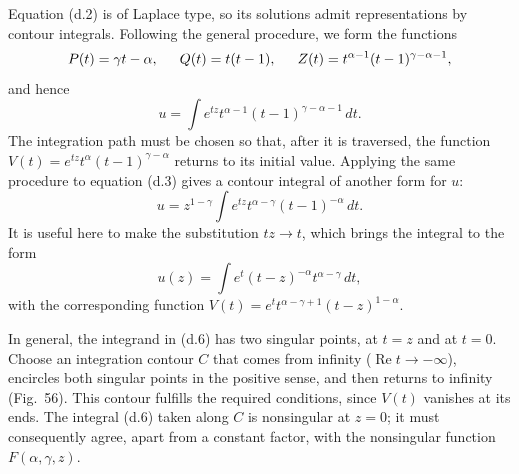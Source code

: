 Equation (d.2) is of Laplace type, so its solutions admit representations by
contour integrals. Following the general procedure, we form the functions
\[
 P(t)=\gamma t-\alpha,\hspace{1.5em}Q(t)=t(t-1),\hspace{1.5em}
 Z(t)=t^{\alpha-1}(t-1)^{\gamma-\alpha-1},
\]
and hence
\begin{equation}
 u=\int e^{tz}t^{\alpha-1}(t-1)^{\gamma-\alpha-1}\,dt.
 \tag{d.5}
\end{equation}
The integration path must be chosen so that, after it is traversed, the
function $V(t)=e^{tz}t^\alpha(t-1)^{\gamma-\alpha}$ returns to its initial
value. Applying the same procedure to equation (d.3) gives a contour integral
of another form for $u$:
\[
 u=z^{1-\gamma}\int e^{tz}t^{\alpha-\gamma}(t-1)^{-\alpha}\,dt.
\]
It is useful here to make the substitution $tz\to t$, which brings the
integral to the form
\begin{equation}
 u(z)=\int e^t(t-z)^{-\alpha}t^{\alpha-\gamma}\,dt,
 \tag{d.6}
\end{equation}
with the corresponding function
$V(t)=e^tt^{\alpha-\gamma+1}(t-z)^{1-\alpha}$.

In general, the integrand in (d.6) has two singular points, at $t=z$ and at
$t=0$. Choose an integration contour $C$ that comes from infinity
($\operatorname{Re}t\to-\infty$), encircles both singular points in the
positive sense, and then returns to infinity (Fig.~56). This contour fulfills
the required conditions, since $V(t)$ vanishes at its ends. The integral (d.6)
taken along $C$ is nonsingular at $z=0$; it must consequently agree, apart
from a constant factor, with the nonsingular function $F(\alpha,\gamma,z)$.

\begin{figure}[ht]
\centering
{}
\caption{ }\label{fig:56}
\end{figure}

